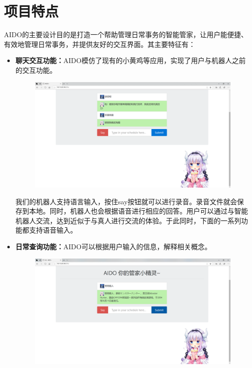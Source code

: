 \documentclass[a4paper, 11pt]{article}
\begin{document}
\section{项目特点}
\par AIDO的主要设计目的是打造一个帮助管理日常事务的智能管家，让用户能便捷、有效地管理日常事务，并提供友好的交互界面。其主要特征有：
\begin{itemize}
\item \textbf{聊天交互功能：}AIDO模仿了现有的小黄鸡等应用，实现了用户与机器人之前的交互功能。
\begin{figure}[H]
\centering
\includegraphics[width=15cm]{fig/chatting}
\end{figure}
\par 我们的机器人支持语言输入，按住say按钮就可以进行录音。录音文件就会保存到本地。同时，机器人也会根据语音进行相应的回答。用户可以通过与智能机器人交流，达到近似于与真人进行交流的体验。于此同时，下面的一系列功能都支持语音输入。
\item \textbf{日常查询功能：}AIDO可以根据用户输入的信息，解释相关概念。
\begin{figure}[H]
\centering
\includegraphics[width=15cm]{fig/wiki}
\end{figure}

\end{itemize}
\end{document}
